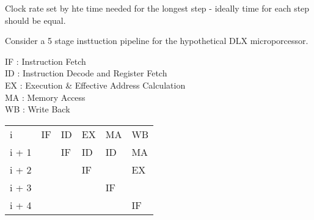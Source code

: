 \documentclass[a4paper,12pt]{article}
\begin{document}
Clock rate set by hte time needed for the longest step - ideally time
for each step should be equal.

Consider a 5 stage insttuction pipeline for the hypothetical DLX
microporcessor.

IF : Instruction Fetch \\
ID	: Instruction Decode and Register Fetch \\
EX : Execution \& Effective Address Calculation \\
MA : Memory Access \\
WB : Write Back


\begin{tabular}{|l|l|l|l|l|l|}
i			&	IF		&	ID	 	&	EX		&	MA		&	WB	\\
i + 1		&			&	IF		&	ID		&	ID		&	MA	\\
i + 2		&			&			&	IF		&			&	EX	\\
i + 3		&			&			&			&	IF		&		\\
i + 4		&			&			&			&			&	IF	\\
\end{tabular}
\end{document}
